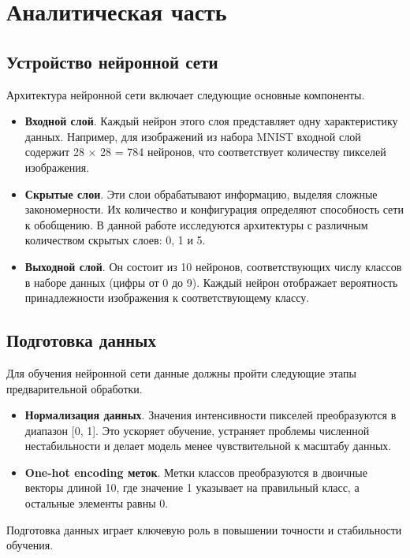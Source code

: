 \chapter{Аналитическая часть}



\section{Устройство нейронной сети}

Архитектура нейронной сети включает следующие основные компоненты.
\begin{itemize}[label*=---]
	\item \textbf{Входной слой}. Каждый нейрон этого слоя представляет одну характеристику данных. Например, для изображений из набора MNIST входной слой содержит 28 × 28 = 784 нейронов, что соответствует количеству пикселей изображения.
	\item \textbf{Скрытые слои}. Эти слои обрабатывают информацию, выделяя сложные закономерности. Их количество и конфигурация определяют способность сети к обобщению. В данной работе исследуются архитектуры с различным количеством скрытых слоев: 0, 1 и 5.
	\item \textbf{Выходной слой}. Он состоит из 10 нейронов, соответствующих числу классов в наборе данных (цифры от 0 до 9). Каждый нейрон отображает вероятность принадлежности изображения к соответствующему классу.
\end{itemize}



\section{Подготовка данных}

Для обучения нейронной сети данные должны пройти следующие этапы предварительной обработки.
\begin{itemize}[label*=---]
	\item \textbf{Нормализация данных}. Значения интенсивности пикселей преобразуются в диапазон [0, 1]. Это ускоряет обучение, устраняет проблемы численной нестабильности и делает модель менее чувствительной к масштабу данных.
	\item \textbf{One-hot encoding меток}. Метки классов преобразуются в двоичные векторы длиной 10, где значение 1 указывает на правильный класс, а остальные элементы равны 0.
\end{itemize}
Подготовка данных играет ключевую роль в повышении точности и стабильности обучения.



